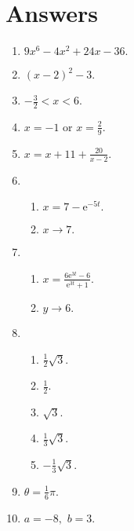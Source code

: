 \section*{Answers}\begin{enumerate}
\item
	$9 x^6 - 4 x^2 + 24 x - 36.$

\item
	$\left( x - 2 \right)^2 - 3.$

\item
	${- \frac{3}{2} < x < 6.}$

\item
	${x=-1}$ or ${x=\frac{2}{9}.}$

\item
	$\displaystyle x=x + 11 + \frac{20}{x - 2}.$

\item
	
	\begin{enumerate}
		\item
			$\displaystyle x = 7-\mathrm{e}^{- 5 t}.$
		\item
			${x \to 7.}$
	\end{enumerate}

\item
	
	\begin{enumerate}
		\item
			$\displaystyle x = \frac{6 \mathrm{e}^{3 t} - 6}{\mathrm{e}^{3 t} + 1}.$
		\item
			${y \to 6.}$
	\end{enumerate}

\item
	
	\begin{enumerate}
		\item
			${\frac{1}{2} \sqrt{3}.}$
		\item
			${\frac{1}{2}.}$
		\item
			${\sqrt{3}.}$
		\item
			${\frac{1}{3} \sqrt{3}.}$
		\item
			${- \frac{1}{3} \sqrt{3}.}$
	\end{enumerate}

\item
	$\theta = \frac{1}{6} \pi.$

\item
	${a = -8,}$ ${b=3.}$


\end{enumerate}